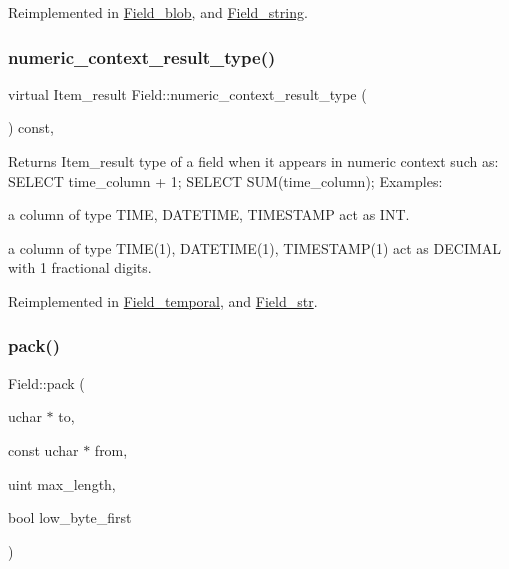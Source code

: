 Reimplemented in \mbox{\hyperlink{classField__blob_ad9fa84e8473ea63cbdd413c99dd9dbb4}{Field\+\_\+blob}}, and \mbox{\hyperlink{classField__string_aefd90b60a7e413fd914d1eb481ed4545}{Field\+\_\+string}}.

\mbox{\label{classField_a834475c74f6d0812dc4aa1abfc483a7f}} 
\subsubsection{\texorpdfstring{numeric\+\_\+context\+\_\+result\+\_\+type()}{numeric\_context\_result\_type()}}
{\footnotesize\ttfamily virtual Item\+\_\+result Field\+::numeric\+\_\+context\+\_\+result\+\_\+type (\begin{DoxyParamCaption}{ }\end{DoxyParamCaption}) const\hspace{0.3cm}{\ttfamily [inline]}, {\ttfamily [virtual]}}

Returns Item\+\_\+result type of a field when it appears in numeric context such as\+: S\+E\+L\+E\+CT time\+\_\+column + 1; S\+E\+L\+E\+CT S\+U\+M(time\+\_\+column); Examples\+:
\begin{DoxyItemize}
\item a column of type T\+I\+ME, D\+A\+T\+E\+T\+I\+ME, T\+I\+M\+E\+S\+T\+A\+MP act as I\+NT.
\item a column of type T\+I\+M\+E(1), D\+A\+T\+E\+T\+I\+M\+E(1), T\+I\+M\+E\+S\+T\+A\+M\+P(1) act as D\+E\+C\+I\+M\+AL with 1 fractional digits. 
\end{DoxyItemize}

Reimplemented in \mbox{\hyperlink{classField__temporal_aa513969b17439a95085975d1ecebe670}{Field\+\_\+temporal}}, and \mbox{\hyperlink{classField__str_a36c5d42ff9dc8b0144a21dad03991ea7}{Field\+\_\+str}}.

\mbox{\label{classField_a9eaff8d3425ef0e1da69b32cbd8f2879}} 
\subsubsection{\texorpdfstring{pack()}{pack()}}
{\footnotesize\ttfamily Field\+::pack (\begin{DoxyParamCaption}\item[{uchar $\ast$}]{to,  }\item[{const uchar $\ast$}]{from,  }\item[{uint}]{max\+\_\+length,  }\item[{bool}]{low\+\_\+byte\+\_\+first }\end{DoxyParamCaption})\hspace{0.3cm}{\ttfamily [virtual]}}

